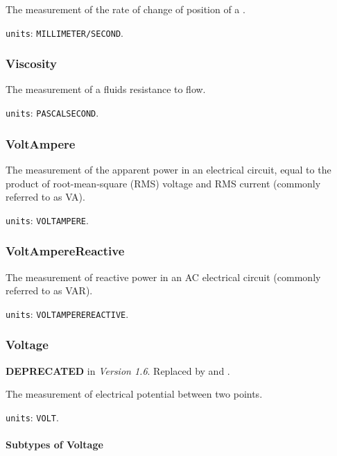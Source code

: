 The measurement of the rate of change of position of a .


\texttt{units}: \texttt{MILLIMETER/SECOND}.


\subsubsection{Viscosity}
\label{sec:Viscosity}



The measurement of a fluids resistance to flow.


\texttt{units}: \texttt{PASCAL\textunderscore SECOND}.


\subsubsection{VoltAmpere}
\label{sec:VoltAmpere}



The measurement of the apparent power in an electrical circuit, equal to the product of root-mean-square (RMS) voltage and RMS current (commonly referred to as VA).


\texttt{units}: \texttt{VOLT\textunderscore AMPERE}.


\subsubsection{VoltAmpereReactive}
\label{sec:VoltAmpereReactive}



The measurement of reactive power in an AC electrical circuit (commonly referred to as VAR).


\texttt{units}: \texttt{VOLT\textunderscore AMPERE\textunderscore REACTIVE}.


\subsubsection{Voltage}
\label{sec:Voltage}



\textbf{DEPRECATED} in \textit{Version 1.6}. Replaced by  and .

The measurement of electrical potential between two points.


\texttt{units}: \texttt{VOLT}.

\paragraph{Subtypes of Voltage}\mbox{}
\label{sec:Subtypes of Voltage}

